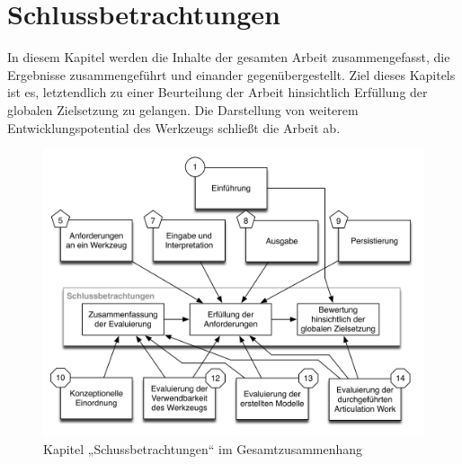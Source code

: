 \chapter{Schlussbetrachtungen} %
\label{cha:schlussbetrachtungen}

In diesem Kapitel werden die Inhalte der gesamten Arbeit zusammengefasst, die Ergebnisse zusammengeführt und einander gegenübergestellt. Ziel dieses Kapitels ist es, letztendlich zu einer Beurteilung der Arbeit hinsichtlich Erfüllung der globalen Zielsetzung zu gelangen. Die Darstellung von weiterem Entwicklungspotential des Werkzeugs schließt die Arbeit ab.

\begin{figure}[htbp]
	\centering
		\includegraphics[scale=0.6]{img/Kontextgrafiken/k15.png}
	\caption{Kapitel „Schussbetrachtungen“ im Gesamtzusammenhang}
	\label{fig:img_Kontextgrafiken_k15}
\end{figure}

